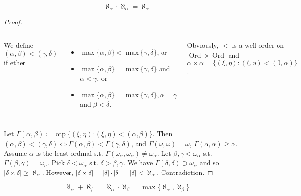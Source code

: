 \documentclass[UTF8,aspectratio=43,11pt,colorlinks,compress,openany]{beamer}%
\begin{document}
\begin{frame}\frametitle{}
\setlength\abovedisplayskip{0pt}
\setlength\belowdisplayskip{0pt}
\begin{theorem}
\[\aleph_\alpha\cdot\aleph_\alpha=\aleph_\alpha\]
\end{theorem}
\begin{proof}
\begin{columns}
We define $(\alpha,\beta)<(\gamma,\delta)$ if ether
\begin{itemize}
	\item $\max\{\alpha,\beta\}<\max\{\gamma,\delta\}$, or
	\item $\max\{\alpha,\beta\}=\max\{\gamma,\delta\}$ and $\alpha<\gamma$, or
	\item $\max\{\alpha,\beta\}=\max\{\gamma,\delta\}, \alpha=\gamma$ and $\beta<\delta$.
\end{itemize}
Obviously, $<$ is a well-order on $\operatorname{Ord}\times\operatorname{Ord}$ and $\alpha\times\alpha=\big\{(\xi,\eta):(\xi,\eta)<(0,\alpha)\big\}$.
\begin{center}
\end{center}
\end{columns}
Let $\Gamma(\alpha,\beta)\coloneqq \operatorname{otp}\big\{(\xi,\eta):(\xi,\eta)<(\alpha,\beta)\big\}$. Then $(\alpha,\beta)<(\gamma,\delta)\iff\Gamma(\alpha,\beta)<\Gamma(\gamma,\delta)$, and $\Gamma(\omega,\omega)=\omega$, $\Gamma(\alpha,\alpha)\geq\alpha$.\\
Assume $\alpha$ is the least ordinal s.t. $\Gamma(\omega_\alpha,\omega_\alpha)\ne \omega_\alpha$. Let $\beta,\gamma<\omega_\alpha$ s.t. $\Gamma(\beta,\gamma)=\omega_\alpha$. Pick $\delta<\omega_\alpha$ s.t. $\delta>\beta,\gamma$. We have $\Gamma(\delta,\delta)\supset\omega_\alpha$ and so $|\delta\times\delta|\geq\aleph_\alpha$. However, $|\delta\times\delta|=|\delta|\cdot|\delta|=|\delta|<\aleph_\alpha$. Contradiction.
\end{proof}
\[\aleph_\alpha+\aleph_\beta=\aleph_\alpha\cdot\aleph_\beta=\max\{\aleph_\alpha,\aleph_\beta\}\]
\end{frame}
\end{document}
